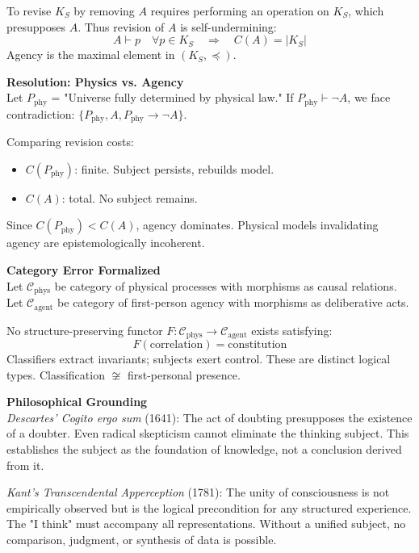 \begin{technical}
    To revise $K_S$ by removing $A$ requires performing an operation on $K_S$, which presupposes $A$. Thus revision of $A$ is self-undermining:
    \[
    A \vdash p \quad \forall p \in K_S \quad \Rightarrow \quad C(A) = |K_S|
    \]
    Agency is the maximal element in $(K_S, \preceq)$.

    \textbf{Resolution: Physics vs. Agency}\\[0.3em]
    Let $P_{\text{phy}}$ = "Universe fully determined by physical law." If $P_{\text{phy}} \vdash \neg A$, we face contradiction: $\{P_{\text{phy}}, A, P_{\text{phy}} \to \neg A\}$.
    
    Comparing revision costs:
    \begin{itemize}[leftmargin=*,topsep=0pt,itemsep=1pt]
        \item $C(P_{\text{phy}})$: finite. Subject persists, rebuilds model.
        \item $C(A)$: total. No subject remains.
    \end{itemize}
    
    Since $C(P_{\text{phy}}) < C(A)$, agency dominates. Physical models invalidating agency are epistemologically incoherent.

    \columnbreak

    \textbf{Category Error Formalized}\\[0.3em]
    Let $\mathcal{C}_{\text{phys}}$ be category of physical processes with morphisms as causal relations. Let $\mathcal{C}_{\text{agent}}$ be category of first-person agency with morphisms as deliberative acts.
    
    No structure-preserving functor $F: \mathcal{C}_{\text{phys}} \to \mathcal{C}_{\text{agent}}$ exists satisfying:
    \[
    F(\text{correlation}) = \text{constitution}
    \]
    Classifiers extract invariants; subjects exert control. These are distinct logical types. Classification $\not\cong$ first-personal presence.

    \textbf{Philosophical Grounding}\\[0.3em]
    \textit{Descartes' Cogito ergo sum} (1641): The act of doubting presupposes the existence of a doubter. Even radical skepticism cannot eliminate the thinking subject. This establishes the subject as the foundation of knowledge, not a conclusion derived from it.

    \textit{Kant's Transcendental Apperception} (1781): The unity of consciousness is not empirically observed but is the logical precondition for any structured experience. The "I think" must accompany all representations. Without a unified subject, no comparison, judgment, or synthesis of data is possible.


\end{technical}

